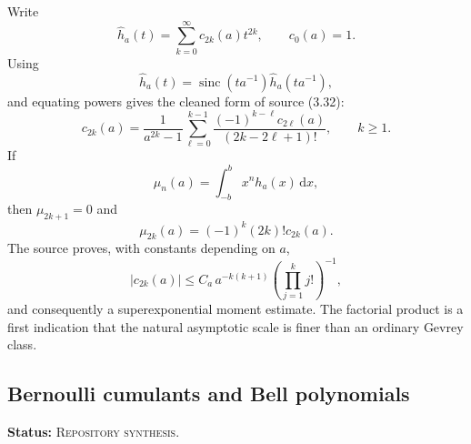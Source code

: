 \documentclass[11pt,oneside]{article}
\theoremstyle{definition}
\theoremstyle{remark}
\newcommand{\sinc}{\operatorname{sinc}}
\newcommand{\dd}{\,\mathrm{d}}
\newcommand{\RepoStatus}{\textcolor{RepoOlive}{\textsc{Repository synthesis}}}
\newcommand{\status}[1]{\par\smallskip\noindent\textbf{Status:} #1.\par\smallskip}
\begin{document}
Write
\begin{equation}
  \widehat h_a(t)=\sum_{k=0}^{\infty}c_{2k}(a)t^{2k},
  \qquad c_0(a)=1.
  \label{eq:ha-c-series}
\end{equation}
Using
\begin{equation}
  \widehat h_a(t)=\sinc(ta^{-1})\widehat h_a(ta^{-1}),
  \label{eq:ha-fourier-refinement}
\end{equation}
and equating powers gives the cleaned form of source (3.32):
\begin{equation}
  c_{2k}(a)=\frac1{a^{2k}-1}
  \sum_{\ell=0}^{k-1}
  \frac{(-1)^{k-\ell}c_{2\ell}(a)}{(2k-2\ell+1)!},
  \qquad k\ge1.
  \label{eq:c-recurrence}
\end{equation}
If
\begin{equation}
  \mu_n(a)=\int_{-b}^{b}x^n h_a(x)\dd x,
  \label{eq:moments-def}
\end{equation}
then \(\mu_{2k+1}=0\) and
\begin{equation}
  \mu_{2k}(a)=(-1)^k(2k)!c_{2k}(a).
  \label{eq:moment-c}
\end{equation}
The source proves, with constants depending on \(a\),
\begin{equation}
  |c_{2k}(a)|\le C_a\,a^{-k(k+1)}
     \left(\prod_{j=1}^{k}j!\right)^{-1},
  \label{eq:source-c-bound}
\end{equation}
and consequently a superexponential moment estimate.  The factorial product is a first indication that the natural asymptotic scale is finer than an ordinary Gevrey class.

\subsection{Bernoulli cumulants and Bell polynomials}
\status{\RepoStatus}
\end{document}
